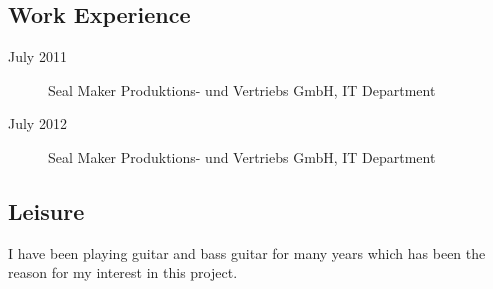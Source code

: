 \subsection{Work Experience}
\begin{description}
	\item[July 2011] Seal Maker Produktions- und Vertriebs GmbH, IT Department
	\item[July 2012] Seal Maker Produktions- und Vertriebs GmbH, IT Department
\end{description}

\subsection{Leisure}
I have been playing guitar and bass guitar for many years which has been the reason for my interest in this project.
